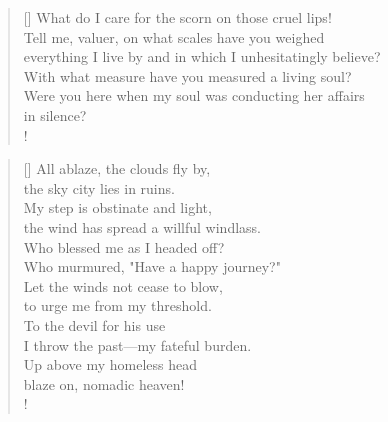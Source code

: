 \documentclass[]{article}
\newcommand{\poemauthorcenter}[1]{\nopagebreak{\centering\footnotesize\textsc{#1}\par}}
\begin{document}
\settowidth{\versewidth}{What do I care for the scorn on those cruel lips!}
\begin{verse}[\versewidth]
What do I care for the scorn on those cruel lips!\\
Tell me, valuer, on what scales have you weighed\\
everything I live by and in which I unhesitatingly believe?\\
With what measure have you measured a living soul?\\
Were you here when my soul was conducting her affairs\\
in silence? \\!
\end{verse}
\poemauthorcenter{\textit{1916}}
\newpage

\vspace*{0.055\textheight}
\settowidth{\versewidth}{All ablaze, the clouds fly by, }
\begin{verse}[\versewidth]
All ablaze, the clouds fly by,\\
the sky city lies in ruins.\\
My step is obstinate and light,\\
the wind has spread a willful windlass.\\
Who blessed me as I headed off?\\
Who murmured, "Have a happy journey?"\\
Let the winds not cease to blow,\\
to urge me from my threshold.\\
To the devil for his use\\
I throw the past—my fateful burden.\\
Up above my homeless head\\
blaze on, nomadic heaven!\\!
\end{verse}
\bigskip \bigskip
\end{document}
